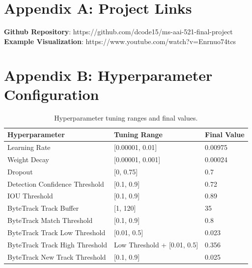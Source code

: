 \documentclass[12pt,stu,donotrepeattitle,floatsintext]{apa7}
\begin{document}
    \begin{appendices}
        \section{Appendix A: Project Links}\label{sec:project-links}
        \noindent \textbf{Github Repository}: https://github.com/dcode15/ms-aai-521-final-project \newline
        \noindent \textbf{Example Visualization}: https://www.youtube.com/watch?v=Enrnuo74tcs

        \section{Appendix B: Hyperparameter Configuration}\label{sec:hyperparameters}

        \begin{table}[h]
        \centering
        \renewcommand{\arraystretch}{0.8}
        \begin{tabular}{|l|l|l|}
            \hline
                \textbf{Hyperparameter} & \textbf{Tuning Range} & \textbf{Final Value} \\ \hline
                Learning Rate & [0.00001, 0.01] & 0.00975 \\ \hline
                Weight Decay & [0.00001, 0.001] & 0.00024 \\ \hline
                Dropout & [0, 0.75] & 0.7 \\ \hline
                Detection Confidence Threshold & [0.1, 0.9] & 0.72 \\ \hline
                IOU Threshold & [0.1, 0.9] & 0.89 \\ \hline
                ByteTrack Track Buffer & [1, 120] & 35 \\ \hline
                ByteTrack Match Threshold & [0.1, 0.9] & 0.8 \\ \hline
                ByteTrack Track Low Threshold & [0.01, 0.5] & 0.023 \\ \hline
                ByteTrack Track High Threshold & Low Threshold + [0.01, 0.5] & 0.356 \\ \hline
                ByteTrack New Track Threshold & [0.1, 0.9] & 0.025 \\ \hline
            \end{tabular}
            \\[10pt]
            \caption{Hyperparameter tuning ranges and final values.}
            \label{tab:hyperparameters}
        \end{table}

    \end{appendices}
\end{document}
